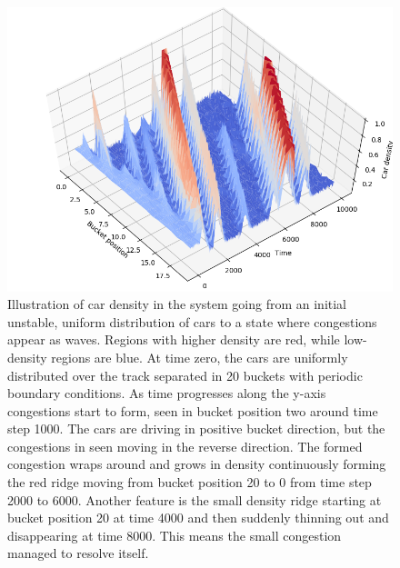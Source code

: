 \documentclass[11pt,a4paper,twocolumn]{article}
\begin{document}
\begin{figure}[t]     
      \centering
       \includegraphics[scale=0.65, trim={0cm 0cm 0cm 2cm}]{figs/side_view2.png}
       \caption{Illustration of car density in the system going from an initial unstable, uniform distribution of cars to a state where congestions appear as waves. Regions with higher density are red, while low-density regions are blue. At time zero, the cars are uniformly distributed over the track separated in 20 buckets with periodic boundary conditions. As time progresses along the y-axis congestions start to form, seen in bucket position two around time step 1000. The cars are driving in positive bucket direction, but the congestions in seen moving in the reverse direction. The formed congestion wraps around and grows in density continuously forming the red ridge moving from bucket position 20 to 0 from time step 2000 to 6000. Another feature is the small density ridge starting at bucket position 20 at time 4000 and then suddenly thinning out and disappearing at time 8000. This means the small congestion managed to resolve itself. }
       \label{fig:phase_transition}
 \end{figure}
\end{document}
